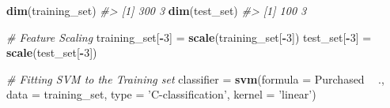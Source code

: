 \documentclass[]{book}
\newenvironment{Shaded}{\begin{snugshade}}{\end{snugshade}}
\newcommand{\CommentTok}[1]{\textcolor[rgb]{0.56,0.35,0.01}{\textit{#1}}}
\newcommand{\DataTypeTok}[1]{\textcolor[rgb]{0.13,0.29,0.53}{#1}}
\newcommand{\DecValTok}[1]{\textcolor[rgb]{0.00,0.00,0.81}{#1}}
\newcommand{\FloatTok}[1]{\textcolor[rgb]{0.00,0.00,0.81}{#1}}
\newcommand{\KeywordTok}[1]{\textcolor[rgb]{0.13,0.29,0.53}{\textbf{#1}}}
\newcommand{\NormalTok}[1]{#1}
\newcommand{\OperatorTok}[1]{\textcolor[rgb]{0.81,0.36,0.00}{\textbf{#1}}}
\newcommand{\OtherTok}[1]{\textcolor[rgb]{0.56,0.35,0.01}{#1}}
\newcommand{\StringTok}[1]{\textcolor[rgb]{0.31,0.60,0.02}{#1}}
\begin{document}
\begin{Shaded}
\end{Shaded}

\begin{Shaded}
\begin{Highlighting}[]
\KeywordTok{dim}\NormalTok{(training_set)}
\CommentTok{#> [1] 300   3}
\KeywordTok{dim}\NormalTok{(test_set)}
\CommentTok{#> [1] 100   3}
\end{Highlighting}
\end{Shaded}

\begin{Shaded}
\begin{Highlighting}[]
\CommentTok{# Feature Scaling }
\NormalTok{training_set[}\OperatorTok{-}\DecValTok{3}\NormalTok{] =}\StringTok{ }\KeywordTok{scale}\NormalTok{(training_set[}\OperatorTok{-}\DecValTok{3}\NormalTok{]) }
\NormalTok{test_set[}\OperatorTok{-}\DecValTok{3}\NormalTok{] =}\StringTok{ }\KeywordTok{scale}\NormalTok{(test_set[}\OperatorTok{-}\DecValTok{3}\NormalTok{]) }
\end{Highlighting}
\end{Shaded}

\begin{Shaded}
\begin{Highlighting}[]
\CommentTok{# Fitting SVM to the Training set }
\NormalTok{classifier =}\StringTok{ }\KeywordTok{svm}\NormalTok{(}\DataTypeTok{formula =}\NormalTok{ Purchased }\OperatorTok{~}\StringTok{ }\NormalTok{., }
                 \DataTypeTok{data =}\NormalTok{ training_set, }
                 \DataTypeTok{type =} \StringTok{'C-classification'}\NormalTok{, }
                 \DataTypeTok{kernel =} \StringTok{'linear'}\NormalTok{) }
\end{Highlighting}
\end{Shaded}
\end{document}
